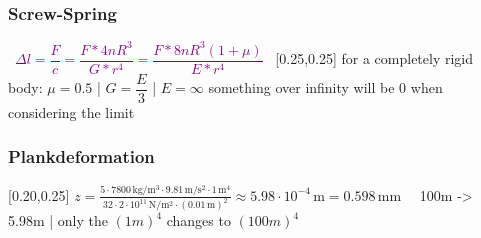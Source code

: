 \documentclass[main.tex,fontsize=8pt,paper=a4,paper=portrait,DIV=calc,]{scrartcl}
\begin{document}
\begin{multicols*}{2}
\subsubsection{Screw-Spring}
\, \newline
\large \textcolor{purple}{\( \Delta l = \dfrac{F}{c} = \dfrac{F * 4nR^3}{G * r^4} = \dfrac{F * 8nR^3 (1 + \mu)}{E * r^4}\)}\newline
\, \newline
\normalsize 
{}[0.25,0.25]\newline
for a completely rigid body: \(\mu = 0.5\) | \(G = \dfrac{E}{3}\) | \(E = \infty\)\newline
something over infinity will be 0 when considering the limit

\subsubsection{Plankdeformation}
[0.20,0.25]\newline
\(z = \frac{5\cdot 7800\,\mathrm{kg}/\mathrm{m}^3\cdot 9.81\,\mathrm{m}/\mathrm{s}^2\cdot 1\,\mathrm{m}^4}{32\cdot 2\cdot 10^{11}\,\mathrm{N}/\mathrm{m}^2 \cdot \left(0.01\,\mathrm{m}\right)^2} \approx 5.98\cdot10^{-4}\,\mathrm{m} = 0.598\,\mathrm{mm}\quad\)\newline
100m -> 5.98m | only the \((1m)^4\) changes to \((100m)^4\)



\end{multicols*}
\end{document}
